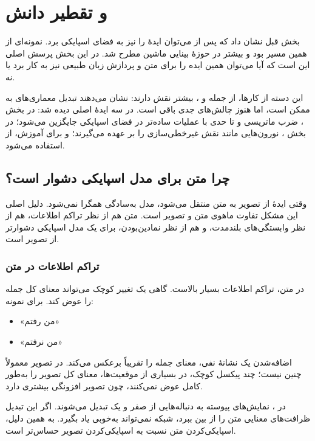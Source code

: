 \section{ و تقطیر دانش}

بخش قبل نشان داد که پس از  می‌توان ایدهٔ  را نیز به فضای اسپایکی برد.  نمونه‌ای از همین مسیر بود و بیشتر در حوزهٔ بینایی ماشین مطرح شد. در این بخش پرسش اصلی این است که آیا می‌توان همین ایده را برای متن و پردازش زبان طبیعی نیز به کار برد یا نه.

این دسته از کارها، از جمله  و ، بیشتر نقش  دارند: نشان می‌دهند تبدیل معماری‌های  به  ممکن است، اما هنوز چالش‌های جدی باقی است. در  سه ایدهٔ اصلی دیده شد: در بخش ، ضرب ماتریسی و  تا حدی با عملیات ساده‌تر در فضای اسپایکی جایگزین می‌شود؛ در بخش ، نورون‌هایی مانند  نقش غیرخطی‌سازی را بر عهده می‌گیرند؛ و برای آموزش، از  استفاده می‌شود.

\subsection{چرا متن برای مدل اسپایکی دشوار است؟}
وقتی ایدهٔ  از تصویر به متن منتقل می‌شود، مدل به‌سادگی همگرا نمی‌شود. دلیل اصلی این مشکل تفاوت ماهوی متن و تصویر است. متن هم از نظر تراکم اطلاعات، هم از نظر وابستگی‌های بلندمدت، و هم از نظر نمادین‌بودن، برای یک مدل اسپایکی دشوارتر از تصویر است.

\subsubsection{تراکم اطلاعات در متن}
در متن، تراکم اطلاعات بسیار بالاست. گاهی یک تغییر کوچک می‌تواند معنای کل جمله را عوض کند. برای نمونه:

\begin{itemize}
  \item «من رفتم»
  \item «من نرفتم»
\end{itemize}

اضافه‌شدن یک نشانهٔ نفی، معنای جمله را تقریباً برعکس می‌کند. در تصویر معمولاً چنین نیست؛ چند پیکسل کوچک، در بسیاری از موقعیت‌ها، معنای کل تصویر را به‌طور کامل عوض نمی‌کنند، چون تصویر افزونگی بیشتری دارد.

در ، نمایش‌های پیوسته به دنباله‌هایی از صفر و یک تبدیل می‌شوند. اگر این تبدیل ظرافت‌های معنایی متن را از بین ببرد، شبکه نمی‌تواند به‌خوبی یاد بگیرد. به همین دلیل، اسپایکی‌کردن متن نسبت به اسپایکی‌کردن تصویر حساس‌تر است.

